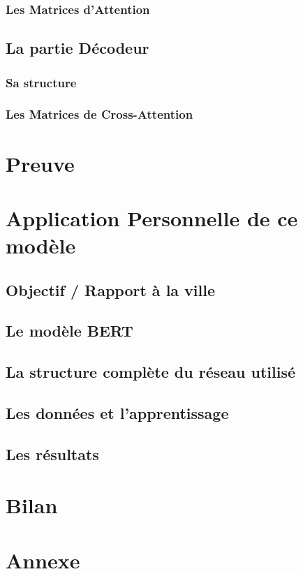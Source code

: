 \documentclass[12pt,a4paper]{article}
\begin{document}
\subsubsection{Les Matrices d'Attention}

\subsection{La partie Décodeur}

\subsubsection{Sa structure}

\subsubsection{Les Matrices de Cross-Attention}

\section{Preuve}

\section{Application Personnelle de ce modèle}

\subsection{Objectif / Rapport à la ville}

\subsection{Le modèle BERT}

\subsection{La structure complète du réseau utilisé}

\subsection{Les données et l'apprentissage}

\subsection{Les résultats}

\section{Bilan}

\section{Annexe}
\end{document}
